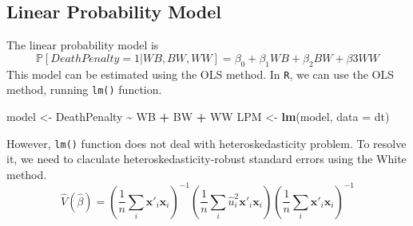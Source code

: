 \documentclass[
  12pt,
]{article}
\newenvironment{Shaded}{\begin{snugshade}}{\end{snugshade}}
\newcommand{\DataTypeTok}[1]{\textcolor[rgb]{0.13,0.29,0.53}{#1}}
\newcommand{\KeywordTok}[1]{\textcolor[rgb]{0.13,0.29,0.53}{\textbf{#1}}}
\newcommand{\NormalTok}[1]{#1}
\newcommand{\OperatorTok}[1]{\textcolor[rgb]{0.81,0.36,0.00}{\textbf{#1}}}
\newcommand{\StringTok}[1]{\textcolor[rgb]{0.31,0.60,0.02}{#1}}
\begin{document}
\hypertarget{linear-probability-model}{%
\subsection{Linear Probability Model}\label{linear-probability-model}}

The linear probability model is \begin{equation*}
  \mathbb{P}[DeathPenalty = 1 | WB, BW, WW]
  = \beta_0 + \beta_1 WB + \beta_2 BW + \beta3 WW
\end{equation*} This model can be estimated using the OLS method. In
\texttt{R}, we can use the OLS method, running \texttt{lm()} function.

\begin{Shaded}
\begin{Highlighting}[]
\NormalTok{model \textless{}{-}}\StringTok{ }\NormalTok{DeathPenalty }\OperatorTok{\textasciitilde{}}\StringTok{ }\NormalTok{WB }\OperatorTok{+}\StringTok{ }\NormalTok{BW }\OperatorTok{+}\StringTok{ }\NormalTok{WW}
\NormalTok{LPM \textless{}{-}}\StringTok{ }\KeywordTok{lm}\NormalTok{(model, }\DataTypeTok{data =}\NormalTok{ dt)}
\end{Highlighting}
\end{Shaded}

However, \texttt{lm()} function does not deal with heteroskedasticity
problem. To resolve it, we need to claculate heteroskedasticity-robust
standard errors using the White method. \begin{equation*}
  \hat{V}(\hat{\beta}) =
  \left( \frac{1}{n} \sum_i \mathbf{x}'_i \mathbf{x}_i  \right)^{-1}
  \left( \frac{1}{n} \sum_i \hat{u}_i^2 \mathbf{x}'_i \mathbf{x}_i \right)
  \left( \frac{1}{n} \sum_i \mathbf{x}'_i \mathbf{x}_i \right)^{-1}
\end{equation*}
\end{document}
